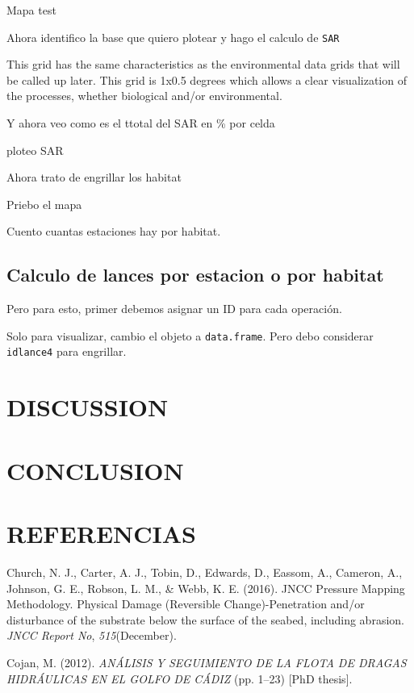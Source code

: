 \documentclass[
]{article}
\newlength{\cslhangindent}
\newlength{\cslentryspacingunit} %
\newenvironment{CSLReferences}[2] %
 {%
  \setlength{\parindent}{0pt}
  \ifodd #1
  \let\oldpar\par
  \def\par{\hangindent=\cslhangindent\oldpar}
  \fi
  \setlength{\parskip}{#2\cslentryspacingunit}
 }%
 {}
\begin{document}
Mapa test

Ahora identifico la base que quiero plotear y hago el calculo de \texttt{SAR}

This grid has the same characteristics as the environmental data grids
that will be called up later. This grid is 1x0.5 degrees which allows a
clear visualization of the processes, whether biological and/or
environmental.

Y ahora veo como es el ttotal del SAR en \% por celda

ploteo SAR

Ahora trato de engrillar los habitat

Priebo el mapa

Cuento cuantas estaciones hay por habitat.

\hypertarget{calculo-de-lances-por-estacion-o-por-habitat}{%
\subsection{Calculo de lances por estacion o por habitat}\label{calculo-de-lances-por-estacion-o-por-habitat}}

Pero para esto, primer debemos asignar un ID para cada operación.

Solo para visualizar, cambio el objeto a \texttt{data.frame}. Pero debo considerar \texttt{idlance4} para engrillar.

\hypertarget{discussion}{%
\section{DISCUSSION}\label{discussion}}

\hypertarget{conclusion}{%
\section{CONCLUSION}\label{conclusion}}

\newpage

\hypertarget{referencias}{%
\section*{REFERENCIAS}\label{referencias}}

\hypertarget{refs}{}
\begin{CSLReferences}{1}{0}
\leavevmode{}%
Church, N. J., Carter, A. J., Tobin, D., Edwards, D., Eassom, A., Cameron, A., Johnson, G. E., Robson, L. M., \& Webb, K. E. (2016). {JNCC Pressure Mapping Methodology. Physical Damage (Reversible Change)-Penetration and/or disturbance of the substrate below the surface of the seabed, including abrasion}. \emph{JNCC Report No}, \emph{515}(December).

\leavevmode{}%
Cojan, M. (2012). \emph{{AN{Á}LISIS Y SEGUIMIENTO DE LA FLOTA DE DRAGAS HIDR{Á}ULICAS EN EL GOLFO DE C{Á}DIZ}} (pp. 1--23) {[}PhD thesis{]}.

\end{CSLReferences}
\end{document}
